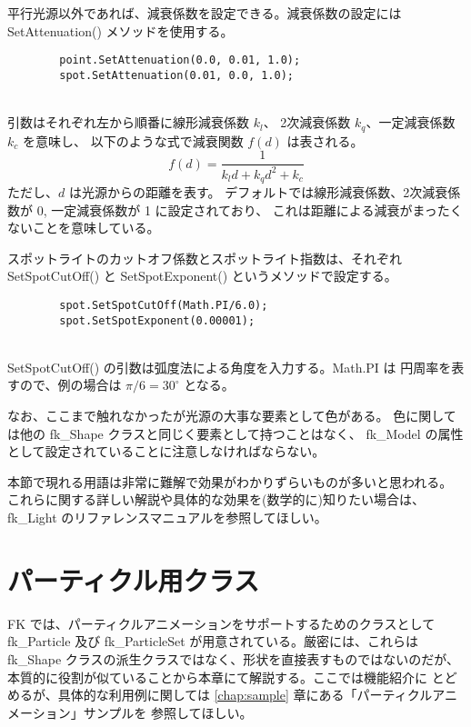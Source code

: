 平行光源以外であれば、減衰係数を設定できる。減衰係数の設定には
SetAttenuation() メソッドを使用する。
\\
\begin{screen}
\begin{verbatim}
        point.SetAttenuation(0.0, 0.01, 1.0);
        spot.SetAttenuation(0.01, 0.0, 1.0);
\end{verbatim}
\end{screen}
~ \\
引数はそれぞれ左から順番に線形減衰係数 \(k_l\)、
2次減衰係数 \(k_q\)、一定減衰係数 \(k_c\) を意味し、
以下のような式で減衰関数 \(f(d)\) は表される。
\[
	f(d) = \frac{1}{k_ld + k_qd^2 + k_c}
\]
ただし、\(d\) は光源からの距離を表す。
デフォルトでは線形減衰係数、2次減衰係数が 0, 一定減衰係数が 1 に設定されており、
これは距離による減衰がまったくないことを意味している。

スポットライトのカットオフ係数とスポットライト指数は、それぞれ
SetSpotCutOff() と SetSpotExponent() というメソッドで設定する。
\\
\begin{screen}
\begin{verbatim}
        spot.SetSpotCutOff(Math.PI/6.0);
        spot.SetSpotExponent(0.00001);
\end{verbatim}
\end{screen}
~ \\
SetSpotCutOff() の引数は弧度法による角度を入力する。Math.PI は
円周率を表すので、例の場合は \(\pi/6 = 30^{\circ}\) となる。

なお、ここまで触れなかったが光源の大事な要素として色がある。
色に関しては他の fk\_Shape クラスと同じく要素として持つことはなく、
fk\_Model の属性として設定されていることに注意しなければならない。

本節で現れる用語は非常に難解で効果がわかりずらいものが多いと思われる。
これらに関する詳しい解説や具体的な効果を(数学的に)知りたい場合は、
fk\_Light のリファレンスマニュアルを参照してほしい。

\section{パーティクル用クラス} \label{sec:particle}
FK では、パーティクルアニメーションをサポートするためのクラスとして
fk\_Particle 及び fk\_ParticleSet が用意されている。厳密には、これらは
fk\_Shape クラスの派生クラスではなく、形状を直接表すものではないのだが、
本質的に役割が似ていることから本章にて解説する。ここでは機能紹介に
とどめるが、具体的な利用例に関しては
\ref{chap:sample} 章にある「パーティクルアニメーション」サンプルを
参照してほしい。

